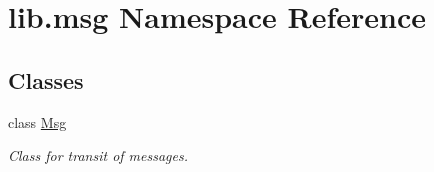 \hypertarget{namespacelib_1_1msg}{}\section{lib.\+msg Namespace Reference}
\label{namespacelib_1_1msg}
\subsection*{Classes}
\begin{DoxyCompactItemize}
\item 
class \hyperlink{classlib_1_1msg_1_1_msg}{Msg}
\begin{DoxyCompactList}\small\item\em Class for transit of messages. \end{DoxyCompactList}\end{DoxyCompactItemize}
